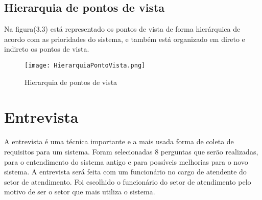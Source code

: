\subsection{ Hierarquia de pontos de vista}
Na figura(3.3) está representado os pontos de vista de forma hierárquica de acordo com as prioridades do sistema, e também está organizado em direto e indireto os pontos de vista.
\begin{figure}[H]
              \begin{center}
                  \caption{Hierarquia de pontos de vista} \label{afp}
                  \texttt{[image: HierarquiaPontoVista.png]} \\

              \end{center}
             \end{figure}

\section{Entrevista}
A entrevista é uma técnica importante e a mais usada forma de coleta de requisitos para um sistema.  Foram selecionadas 8 perguntas que serão realizadas, para o entendimento do sistema antigo e para possíveis melhorias para o novo sistema. A entrevista será feita com um funcionário no cargo de atendente do setor de atendimento. Foi escolhido o funcionário do setor de atendimento pelo motivo de ser o setor que mais utiliza o sistema. \\

